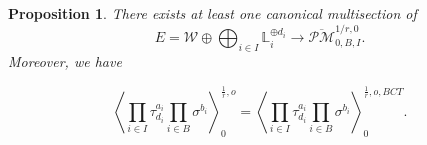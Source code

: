 \documentclass[11pt]{amsart}
\newtheorem{prop}[dummy]{Proposition}
\theoremstyle{definition}
\theoremstyle{remark}
\newcommand{\oPMb}{{\overline{\mathcal{PM}}}}
\newcommand{\<}{\left<}
\renewcommand{\>}{\right>}
\numberwithin{equation}{section}
\begin{document}
    

    \begin{prop}\label{prop compare with BCT in g=0} 
    There exists at least one canonical multisection of $$E=\mathcal W\oplus \bigoplus_{i\in I} \mathbb L_i^{\oplus d_i}\to \oPMb^{1/r,0}_{0,B,I}.$$
    Moreover, we have

   \begin{equation}\label{eq compare with BCT}
    \left\langle \prod_{i\in I}\tau^{a_i}_{d_i}\prod_{i \in B}\sigma^{b_i}\right\rangle^{\frac{1}{r},o}_0 
    =
    \left\langle \prod_{i\in I}\tau^{a_i}_{d_i}\prod_{i \in B}\sigma^{b_i}\right\rangle^{\frac{1}{r},o,BCT}_0.
    \end{equation}
        
    \end{prop}
\end{document}
